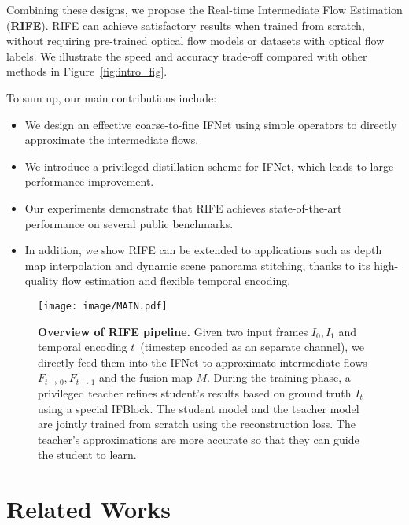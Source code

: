 \documentclass[final]{cvpr}
\begin{document}
Combining these designs, we propose the Real-time Intermediate Flow Estimation (\textbf{RIFE}). RIFE can achieve satisfactory results when trained from scratch, without requiring pre-trained optical flow models or datasets with optical flow labels. We illustrate the speed and accuracy trade-off compared with other methods in Figure~\ref{fig:intro_fig}. 

To sum up, our main contributions include:
\begin{itemize}
	\item We design an effective coarse-to-fine IFNet using simple operators to directly approximate the intermediate flows. 
	\item We introduce a privileged distillation scheme for IFNet, which leads to large performance improvement.
	\item Our experiments demonstrate that RIFE achieves state-of-the-art performance on several public benchmarks. 
	\item In addition, we show RIFE can be extended to applications such as depth map interpolation and dynamic scene panorama stitching, thanks to its high-quality flow estimation and flexible temporal encoding.
\end{itemize}










\begin{figure*}
	\centering
	\texttt{[image: image/MAIN.pdf]}
	\caption{\textbf{Overview of RIFE pipeline.} Given two input frames $I_0, I_1$ and temporal encoding $t$~(timestep encoded as an separate channel), we directly feed them into the IFNet to approximate intermediate flows $F_{t\rightarrow 0}, F_{t\rightarrow 1}$ and the fusion map $M$. During the training phase, a privileged teacher refines student's results based on ground truth $I_t$ using a special IFBlock. The student model and the teacher model are jointly trained from scratch using the reconstruction loss. The teacher's approximations are more accurate so that they can guide the student to learn. }\label{fig:main}
\end{figure*} 	\section{Related Works}
\end{document}
